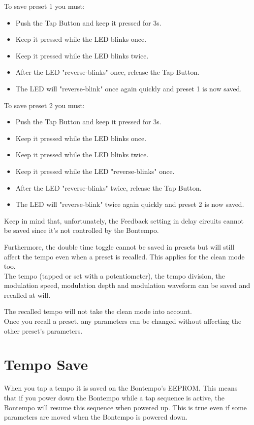 \documentclass[a4paper, 10pt]{article}
\begin{document}
To save preset 1 you must:\\
\begin{itemize}
\item Push the Tap Button and keep it pressed for 3s.
\item Keep it pressed while the LED blinks once.
\item Keep it pressed while the LED blinks twice.
\item After the LED "reverse-blinks" once, release the  Tap Button.
\item The LED will "reverse-blink" once again quickly and preset 1 is now saved.\\
\end{itemize}

To save preset 2 you must:\\
\begin{itemize}
\item Push the Tap Button and keep it pressed for 3s.
\item Keep it pressed while the LED blinks once.
\item Keep it pressed while the LED blinks twice.
\item Keep it pressed while the LED "reverse-blinks" once.
\item After the LED "reverse-blinks" twice, release the  Tap Button.
\item The LED will "reverse-blink" twice again quickly and preset 2 is now saved.\\
\end{itemize}

Keep in mind that, unfortunately, the Feedback setting in delay circuits cannot be saved since it's not controlled by the Bontempo.

Furthermore, the double time toggle cannot be saved in presets but will still affect the tempo even when a preset is recalled. This applies for the clean mode too.\\

The tempo (tapped or set with a potentiometer), the tempo division, the modulation speed, modulation depth and modulation waveform can be saved and recalled at will.

The recalled tempo will not take the clean mode into account.\\

Once you recall a preset, any parameters can be changed without affecting the other preset's parameters.\\

\section{Tempo Save}
\label{sec:temposave}
\bigbreak
When you tap a tempo it is saved on the Bontempo's EEPROM. This means that if you power down the Bontempo while a tap sequence is active, the Bontempo will resume this sequence when powered up. This is true even if some parameters are moved when the Bontempo is powered down.\\
\end{document}
